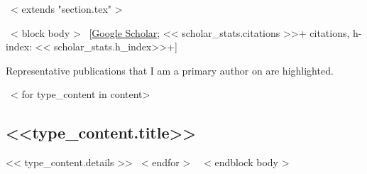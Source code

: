 ~< extends "section.tex" >~

~< block body >~
\vspace{-8.2mm}\hspace{30mm}[\href{https://scholar.google.com/citations?user=<< scholar_id >>}{Google Scholar};
<< scholar_stats.citations >>+ citations, h-index: << scholar_stats.h_index>>+]\vspace{3mm}


Representative publications that I am a primary author on are
\colorbox{tab_highlight}{highlighted.}



~< for type_content in content>~
  \subsection{<<type_content.title>>}
  << type_content.details >>
~< endfor >~
~< endblock body >~